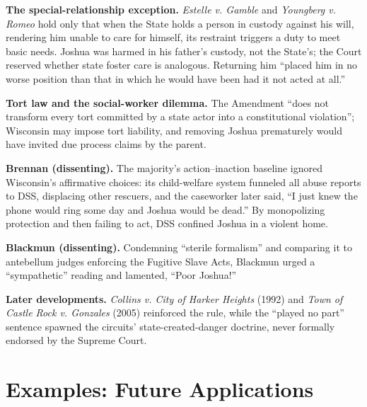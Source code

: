 \documentclass[12pt]{article}
\begin{document}
\textbf{The special-relationship exception.} \textit{Estelle v. Gamble} and \textit{Youngberg v. Romeo} hold only that when the State holds a person in custody against his will, rendering him unable to care for himself, its restraint triggers a duty to meet basic needs. Joshua was harmed in his father's custody, not the State's; the Court reserved whether state foster care is analogous. Returning him ``placed him in no worse position than that in which he would have been had it not acted at all.''

\textbf{Tort law and the social-worker dilemma.} The Amendment ``does not transform every tort committed by a state actor into a constitutional violation''; Wisconsin may impose tort liability, and removing Joshua prematurely would have invited due process claims by the parent.

\textbf{Brennan (dissenting).} The majority's action--inaction baseline ignored Wisconsin's affirmative choices: its child-welfare system funneled all abuse reports to DSS, displacing other rescuers, and the caseworker later said, ``I just knew the phone would ring some day and Joshua would be dead.'' By monopolizing protection and then failing to act, DSS confined Joshua in a violent home.

\textbf{Blackmun (dissenting).} Condemning ``sterile formalism'' and comparing it to antebellum judges enforcing the Fugitive Slave Acts, Blackmun urged a ``sympathetic'' reading and lamented, ``Poor Joshua!''

\textbf{Later developments.} \textit{Collins v. City of Harker Heights} (1992) and \textit{Town of Castle Rock v. Gonzales} (2005) reinforced the rule, while the ``played no part'' sentence spawned the circuits' state-created-danger doctrine, never formally endorsed by the Supreme Court.

\section{Examples: Future Applications}
\end{document}
